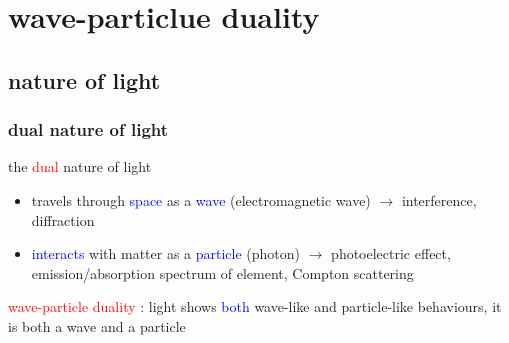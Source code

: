 \documentclass[12pt,xcolor=svgnames,handout]{beamer}
\newcommand{\keypoint}[1]{%
   \textcolor{red}{#1}%
}
\newcommand{\tightframetitle}[1]{ %
\frametitle{#1}\vspace{-.6\baselineskip}}
\begin{document}
\section{wave-particlue duality}
\subsection{nature of light}
\begin{frame}
	\tightframetitle{dual nature of light}
	
	\begin{block}{}
		the \textcolor{red}{dual} nature of light
		\begin{itemize}
			\item travels through \textcolor{blue}{space} as a \textcolor{blue}{wave} (electromagnetic wave) $\rightarrow$ interference, diffraction
			
			\item \textcolor{blue}{interacts} with matter as a \textcolor{blue}{particle} (photon) $\rightarrow$ photoelectric effect, emission/absorption spectrum of element, Compton scattering
		\end{itemize}
	\end{block}
	
	\pause
	
	\begin{block}{}
		\keypoint{wave-particle duality}: light shows \textcolor{blue}{both} wave-like and particle-like behaviours, it is both a wave and a particle
	\end{block}
	
\end{frame}
\end{document}
